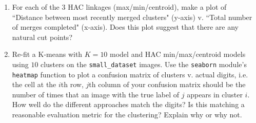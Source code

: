 \documentclass[submit]{harvardml}
\begin{document}
\begin{problem}
\begin{enumerate}
\item For each of the 3 HAC linkages (max/min/centroid), make a plot of
  ``Distance between most recently merged clusters" (y-axis) v. ``Total number of merges completed" (x-axis).
  Does this plot suggest that there are any  natural cut points? 

\item Re-fit a K-means with $K = 10$ model and HAC min/max/centroid models using $10$ clusters on the \texttt{small\_dataset} images. Use the \texttt{seaborn} module's \texttt{heatmap} function to plot a confusion matrix of clusters v. actual digits, i.e. the cell at the $i$th row, $j$th column of your confusion matrix should be the number of times that an image with the true label of $j$ appears in cluster $i$. How well do the different approaches match the digits? Is this matching a reasonable evaluation metric for the clustering?  Explain why or why not.  
  
\end{enumerate}

\end{problem}

\end{document}
